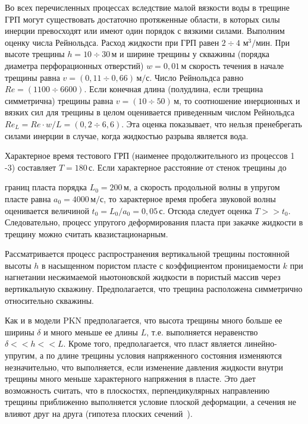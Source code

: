Во всех перечисленных процессах вследствие малой вязкости воды в трещине ГРП могут существовать достаточно протяженные области, в которых силы инерции превосходят или имеют один порядок с вязкими силами. Выполним оценку числа Рейнольдса. Расход жидкости при ГРП равен $2 \div 4$ $\text{м}^3/\text{мин}$. При высоте трещины $h = 10 \div 30\, \text{м}$ и ширине трещины у скважины (порядка диаметра перфорационных отверстий) $w = 0,01 \, \text{м}$ скорость течения в начале трещины равна $v =(0,11 \div 0,66)\, \text{м}/\text{с}$. Число Рейнольдса равно  $Re =(1100 \div 6600)$. Если конечная длина (полудлина, если трещина симметрична) трещины равна $v =(10 \div 50)\, \text{м}$, то соотношение инерционных и вязких сил для трещины в целом оценивается приведенным числом Рейнольдса $Re_L =Re \cdot w/L=(0,2 \div 6,6)$. Эта оценка показывает, что нельзя пренебрегать силами инерции в случае, когда жидкостью разрыва является вода.

	

Характерное время тестового ГРП (наименее продолжительного из процессов 1 -3) составляет $T =180\, \text{с}$. Если характерное расстояние от стенок трещины до 

границ пласта порядка $L_0 = 200 \, \text{м}$, а скорость продольной волны в упругом пласте равна $a_0 = 4000\, \text{м}/\text{с}$, то характерное время пробега звуковой волны оценивается величиной $t_0 = L_0/a_0 = 0,05 \, \text{с}$. Отсюда следует оценка $T>> t_0$. Следовательно, процесс упругого деформирования пласта при закачке жидкости в трещину можно считать квазистационарным.




Рассматривается процесс распространения вертикальной трещины постоянной высоты $h$ в насыщенном пористом пласте с коэффициентом проницаемости $k$ при нагнетании несжимаемой ньютоновской жидкости в пористый массив через вертикальную скважину. Предполагается, что трещина расположена симметрично относительно скважины.



Как и в модели PKN предполагается, что высота трещины много больше ее ширины $\delta$ и много меньше ее длины $L$, т.е. выполняется неравенство $\delta << h << L$. Кроме того, предполагается, что пласт является линейно-упругим, а по длине трещины условия напряженного состояния изменяются незначительно, что выполняется, если изменение давления жидкости внутри трещины много меньше характерного напряжения в пласте. Это дает возможность считать, что в плоскостях, перпендикулярных направлению трещины приближенно выполняется условие плоской деформации, а сечения не влияют друг на друга (гипотеза плоских сечений~\cite{Perkins_Kern, Nordgren1}).



